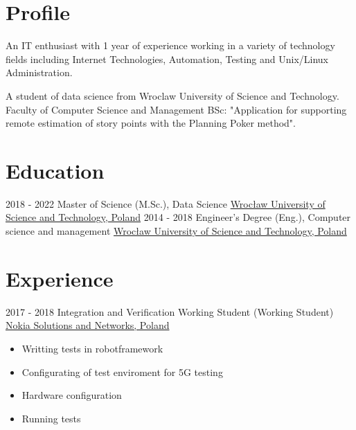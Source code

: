 \documentclass[letterpaper]{tenseconds} %
\begin{document}
\makeprofile %

\section{Profile}
\textnormal{\faInfo} An IT enthusiast with 1 year of experience working in a variety of technology fields including Internet Technologies, Automation, Testing and Unix/Linux Administration.

\textnormal{\faGraduationCap} A student of data science from Wroclaw University of Science and Technology. Faculty of Computer Science and Management BSc: "Application for supporting remote estimation of
story points with the Planning Poker method". \vspace{2mm}

\section{Education}
\begin{twenty} %
	\twentyitem
	{2018 - 2022}
	{}
	{Master of Science (M.Sc.), Data Science}
	{\href{https://pwr.edu.pl/}{Wrocław University of Science and Technology, Poland}}
	{}
	{}
	\twentyitem
	{2014 - 2018}
	{}
	{Engineer's Degree (Eng.), Computer science and management}
	{\href{https://pwr.edu.pl/}{Wrocław University of Science and Technology, Poland}}
	{}
	{}
\end{twenty}

\section{Experience}
\begin{twenty} %
	\twentyitem
	{2017 - 2018}
	{}
	{Integration and Verification Working Student \textnormal{(Working Student)}}
	{\href{https://nokiawroclaw.pl/}{Nokia Solutions and Networks, Poland}}
	{}
	{\begin{itemize}
		\item Writting tests in robotframework
		\item Configurating of test enviroment for 5G testing
		\item Hardware configuration
		\item Running tests
	\end{itemize}}
\end{twenty}
\end{document}
